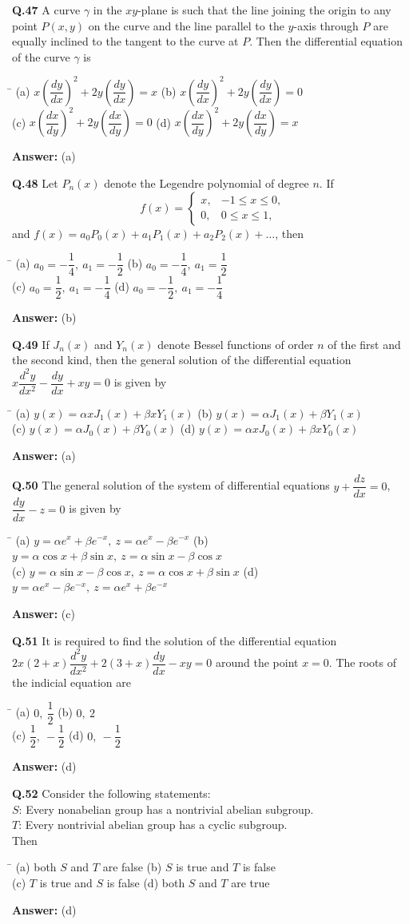 \documentclass[11pt,a4paper]{article}
\newcommand{\optsfour}[4]{%
  \begin{tabbing}
    \hspace{0.48\linewidth}\=\kill
    (a) #1 \> (b) #2 \\[2pt]
    (c) #3 \> (d) #4
  \end{tabbing}%
}
\newcommand{\ans}[1]{\textbf{Answer:} #1\par\medskip}
\begin{document}
\textbf{Q.47} A curve $\gamma$ in the $xy$-plane is such that the line joining the origin to any point $P(x,y)$ on the curve and the line parallel to the $y$-axis through $P$ are equally inclined to the tangent to the curve at $P$. Then the differential equation of the curve $\gamma$ is
\optsfour{$x\left(\dfrac{dy}{dx}\right)^2 + 2y\left(\dfrac{dy}{dx}\right) = x$}{$x\left(\dfrac{dy}{dx}\right)^2 + 2y\left(\dfrac{dy}{dx}\right) = 0$}{$x\left(\dfrac{dx}{dy}\right)^2 + 2y\left(\dfrac{dx}{dy}\right) = 0$}{$x\left(\dfrac{dx}{dy}\right)^2 + 2y\left(\dfrac{dx}{dy}\right) = x$}
\ans{(a)}

\textbf{Q.48} Let $P_n(x)$ denote the Legendre polynomial of degree $n$. If
\[
  f(x) = \begin{cases} x, & -1 \le x \le 0, \\ 0, & 0 \le x \le 1, \end{cases}
\]
and $f(x) = a_0 P_0(x) + a_1 P_1(x) + a_2 P_2(x) + \dots$, then
\optsfour{$a_0 = -\dfrac{1}{4},\ a_1 = -\dfrac{1}{2}$}{$a_0 = -\dfrac{1}{4},\ a_1 = \dfrac{1}{2}$}{$a_0 = \dfrac{1}{2},\ a_1 = -\dfrac{1}{4}$}{$a_0 = -\dfrac{1}{2},\ a_1 = -\dfrac{1}{4}$}
\ans{(b)}

\textbf{Q.49} If $J_n(x)$ and $Y_n(x)$ denote Bessel functions of order $n$ of the first and the second kind, then the general solution of the differential equation $x\dfrac{d^2 y}{dx^2} - \dfrac{dy}{dx} + xy = 0$ is given by
\optsfour{$y(x) = \alpha x J_1(x) + \beta x Y_1(x)$}{$y(x) = \alpha J_1(x) + \beta Y_1(x)$}{$y(x) = \alpha J_0(x) + \beta Y_0(x)$}{$y(x) = \alpha x J_0(x) + \beta x Y_0(x)$}
\ans{(a)}

\textbf{Q.50} The general solution of the system of differential equations $y + \dfrac{dz}{dx} = 0$, $\dfrac{dy}{dx} - z = 0$ is given by
\optsfour{$y = \alpha e^x + \beta e^{-x},\ z = \alpha e^x - \beta e^{-x}$}{$y = \alpha\cos x + \beta\sin x,\ z = \alpha\sin x - \beta\cos x$}{$y = \alpha\sin x - \beta\cos x,\ z = \alpha\cos x + \beta\sin x$}{$y = \alpha e^x - \beta e^{-x},\ z = \alpha e^x + \beta e^{-x}$}
\ans{(c)}

\textbf{Q.51} It is required to find the solution of the differential equation $2x(2 + x)\dfrac{d^2 y}{dx^2} + 2(3 + x)\dfrac{dy}{dx} - xy = 0$ around the point $x = 0$. The roots of the indicial equation are
\optsfour{$0,\ \dfrac{1}{2}$}{$0,\ 2$}{$\dfrac{1}{2},\ -\dfrac{1}{2}$}{$0,\ -\dfrac{1}{2}$}
\ans{(d)}

\textbf{Q.52} Consider the following statements:\\
$S$: Every nonabelian group has a nontrivial abelian subgroup.\\
$T$: Every nontrivial abelian group has a cyclic subgroup.\\
Then
\optsfour{both $S$ and $T$ are false}{$S$ is true and $T$ is false}{$T$ is true and $S$ is false}{both $S$ and $T$ are true}
\ans{(d)}
\end{document}
